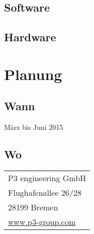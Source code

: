   \subsection{Software}
  \label{ssec:software}

  \subsection{Hardware}
  \label{ssec:hardware}


\section{Planung}
\label{sec:planung}

  \subsection{Wann}
  \label{ssec:wann}
    März bis Juni 2015

  \subsection{Wo}
  \label{ssec:wo}
    \begin{tabular}{l}
      P3 engineering GmbH\\
      Flughafenallee 26/28\\
      28199 Bremen\\
      \href{www.p3-group.com}{www.p3-group.com}\\
    \end{tabular}

